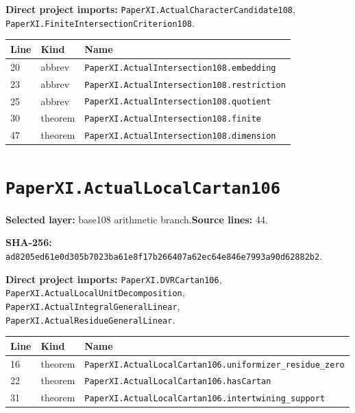 \documentclass[10pt,oneside]{book}
\begin{document}

\textbf{Direct project imports:} \nolinkurl{PaperXI.ActualCharacterCandidate108}, \nolinkurl{PaperXI.FiniteIntersectionCriterion108}.

\begin{longtable}{@{}p{}p{}p{}@{}}\toprule Line&Kind&Name\\\midrule\endhead

20&abbrev&\nolinkurl{PaperXI.ActualIntersection108.embedding}\\

23&abbrev&\nolinkurl{PaperXI.ActualIntersection108.restriction}\\

25&abbrev&\nolinkurl{PaperXI.ActualIntersection108.quotient}\\

30&theorem&\nolinkurl{PaperXI.ActualIntersection108.finite}\\

47&theorem&\nolinkurl{PaperXI.ActualIntersection108.dimension}\\

\bottomrule\end{longtable}

\section{\texorpdfstring{\nolinkurl{PaperXI.ActualLocalCartan106}}{PaperXI.ActualLocalCartan106}}\label{module:PaperXI.ActualLocalCartan106}

\textbf{Selected layer:} base108 arithmetic branch.\quad\textbf{Source lines:} 44.\par\textbf{SHA-256:} {\scriptsize\nolinkurl{ad8205ed61e0d305b7023ba61e8f17b266407a62ec64e846e7993a90d62882b2}}.


\textbf{Direct project imports:} \nolinkurl{PaperXI.DVRCartan106}, \nolinkurl{PaperXI.ActualLocalUnitDecomposition}, \nolinkurl{PaperXI.ActualIntegralGeneralLinear}, \nolinkurl{PaperXI.ActualResidueGeneralLinear}.

\begin{longtable}{@{}p{}p{}p{}@{}}\toprule Line&Kind&Name\\\midrule\endhead

16&theorem&\nolinkurl{PaperXI.ActualLocalCartan106.uniformizer_residue_zero}\\

22&theorem&\nolinkurl{PaperXI.ActualLocalCartan106.hasCartan}\\

31&theorem&\nolinkurl{PaperXI.ActualLocalCartan106.intertwining_support}\\

\bottomrule\end{longtable}
\end{document}
